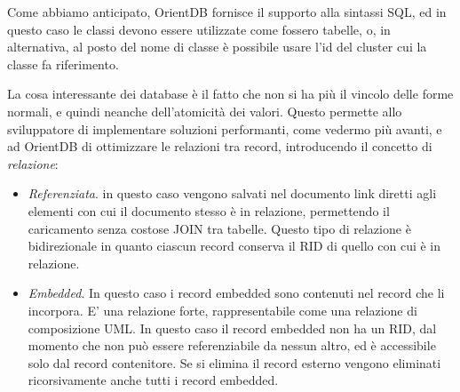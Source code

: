 Come abbiamo anticipato, OrientDB fornisce il supporto alla sintassi SQL, ed in questo caso le classi devono essere utilizzate come fossero tabelle, o, in alternativa, al posto del nome di classe è possibile usare l'id del cluster cui la classe fa riferimento.

La cosa interessante dei database è il fatto che non si ha più il vincolo delle forme normali, e quindi neanche dell'atomicità dei valori. Questo permette allo sviluppatore di implementare soluzioni performanti, come vedermo più avanti, e ad OrientDB di ottimizzare le relazioni tra record, introducendo il concetto di \emph{relazione}:
\begin{itemize}
\item \emph{Referenziata}. in questo caso vengono salvati nel documento link diretti agli elementi con cui il documento stesso è in relazione, permettendo il caricamento senza costose JOIN tra tabelle. Questo tipo di relazione è bidirezionale in quanto ciascun record conserva il RID di quello con cui è in relazione.
\item \emph{Embedded}. In questo caso i record embedded sono contenuti nel record che li incorpora. E' una relazione forte, rappresentabile come una relazione di composizione UML. In questo caso il record embedded non ha un RID, dal momento che non può essere referenziabile da nessun altro, ed è accessibile solo dal record contenitore. Se si elimina il record esterno vengono eliminati ricorsivamente anche tutti i record embedded.
\end{itemize}

\endinput

